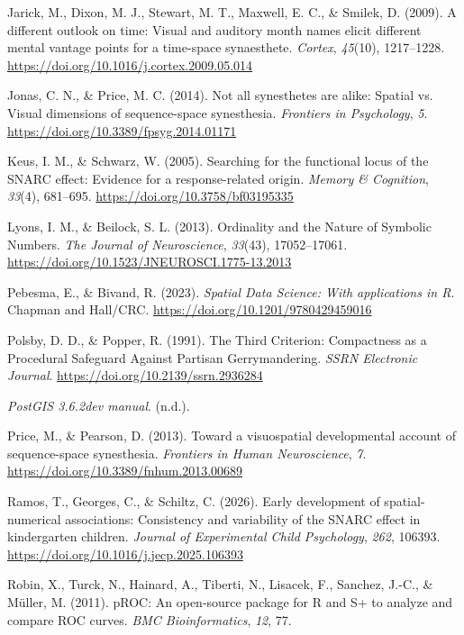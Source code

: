 \documentclass[
  man,
  floatsintext,
  longtable,
  a4paper,
  nolmodern,
  notxfonts,
  notimes,
  colorlinks=true,linkcolor=blue,citecolor=blue,urlcolor=blue]{apa7}
\newlength{\cslhangindent}
\newenvironment{CSLReferences}[2] %
 {\begin{list}{}{%
  \setlength{\itemindent}{0pt}
  \setlength{\leftmargin}{0pt}
  \setlength{\parsep}{0pt}
  \ifodd #1
   \setlength{\leftmargin}{\cslhangindent}
   \setlength{\itemindent}{-1\cslhangindent}
  \fi
  \setlength{\itemsep}{#2\baselineskip}}}
 {\end{list}}
\begin{document}
\begin{CSLReferences}{1}{0}
Jarick, M., Dixon, M. J., Stewart, M. T., Maxwell, E. C., \& Smilek, D.
(2009). A different outlook on time: Visual and auditory month names
elicit different mental vantage points for a time-space synaesthete.
\emph{Cortex}, \emph{45}(10), 1217--1228.
\url{https://doi.org/10.1016/j.cortex.2009.05.014}

Jonas, C. N., \& Price, M. C. (2014). Not all synesthetes are alike:
Spatial vs. Visual dimensions of sequence-space synesthesia.
\emph{Frontiers in Psychology}, \emph{5}.
\url{https://doi.org/10.3389/fpsyg.2014.01171}

Keus, I. M., \& Schwarz, W. (2005). Searching for the functional locus
of the SNARC effect: Evidence for a response-related origin.
\emph{Memory \& Cognition}, \emph{33}(4), 681--695.
\url{https://doi.org/10.3758/bf03195335}

Lyons, I. M., \& Beilock, S. L. (2013). Ordinality and the Nature of
Symbolic Numbers. \emph{The Journal of Neuroscience}, \emph{33}(43),
17052--17061. \url{https://doi.org/10.1523/JNEUROSCI.1775-13.2013}

Pebesma, E., \& Bivand, R. (2023). \emph{{Spatial Data Science: With
applications in {R}}}. {Chapman and Hall/CRC}.
\url{https://doi.org/10.1201/9780429459016}

Polsby, D. D., \& Popper, R. (1991). The Third Criterion: Compactness as
a Procedural Safeguard Against Partisan Gerrymandering. \emph{SSRN
Electronic Journal}. \url{https://doi.org/10.2139/ssrn.2936284}

\emph{PostGIS 3.6.2dev manual}. (n.d.).

Price, M., \& Pearson, D. (2013). Toward a visuospatial developmental
account of sequence-space synesthesia. \emph{Frontiers in Human
Neuroscience}, \emph{7}. \url{https://doi.org/10.3389/fnhum.2013.00689}

Ramos, T., Georges, C., \& Schiltz, C. (2026). Early development of
spatial-numerical associations: Consistency and variability of the SNARC
effect in kindergarten children. \emph{Journal of Experimental Child
Psychology}, \emph{262}, 106393.
\url{https://doi.org/10.1016/j.jecp.2025.106393}

Robin, X., Turck, N., Hainard, A., Tiberti, N., Lisacek, F., Sanchez,
J.-C., \& Müller, M. (2011). {pROC}: An open-source package for {R} and
{S}+ to analyze and compare ROC curves. \emph{BMC Bioinformatics},
\emph{12}, 77.


\end{CSLReferences}
\end{document}
